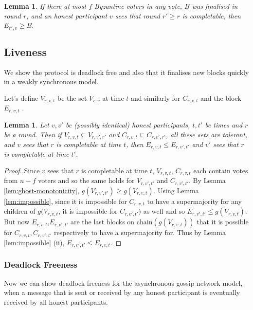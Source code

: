 \documentclass{article}
\newtheorem{lemma}[theorem]{Lemma}
\begin{document}
\begin{lemma} \label{lem:overestimate-final}
If there at most $f$ Byzantine voters in any vote, $B$ was finalised in round $r$, and an honest participant $v$ sees that round $r' \geq r$ is completable, then $E_{r',v} \geq B$.
\end{lemma}

\subsection{Liveness }

We show the protocol is deadlock free and also that it finalises new blocks quickly in a weakly synchronous model.

Let's define $V_{r,v,t}$ be the set $V_{r,v}$ at time $t$ and similarly for $C_{r,v,t}$ and the block $E_{r,v,t}$ .


\begin{lemma} \label{lem:message-monotonicity-completed-estimate}
Let $v,v'$ be (possibly identical) honest participants, $t,t'$ be times and $r$ be a round.
Then if $V_{r,v,t} \subseteq V_{r,v',r'}$ and $C_{r,v,t} \subseteq C_{r,v',r'}$, all these sets are tolerant, and $v$ sees that $r$ is completable at time $t$, then $E_{r,v,t} \leq E_{r,v',t'}$ and $v'$ sees that $r$ is completable at time $t'$.
\end{lemma}

\begin{proof} Since $v$ sees that $r$ is completable at time $t$, $V_{r,v,t}$, $C_{r,v,t}$ each contain votes from $n-f$ voters and so the same holds for $V_{r,v',t'}$ and $C_{r,v',t'}$. 
By Lemma \ref{lem:ghost-monotonicity}, $g(V_{r,v',t'}) \geq g(V_{r,v,t})$.
Using Lemma \ref{lem:impossible}, since it is impossible for $C_{r,v,t}$ to have a supermajority for any children of $g(V_{r,v,t}$, it is impossible for $C_{r,v',t'})$ as well and so $E_{r,v',t'} \leq g(V_{r,v,t})$.
But now $E_{r,v,t}$,$E_{r,v',t'}$ are the last blocks on $\textrm{chain}(g(V_{r,v,t}))$ that it is possible for $C_{r,v,t},C_{r,v',t'}$ respectively to have a supermajority for.
Thus by Lemma \ref{lem:impossible} (ii), $E_{r,v',t'} \leq E_{r,v,t}$.
\end{proof}
 
\subsubsection{Deadlock Freeness}

Now we can show deadlock freeness for the asynchronous gossip network model, when a message that is sent or received by any honest participant is eventually received by all honest participants.
\end{document}
